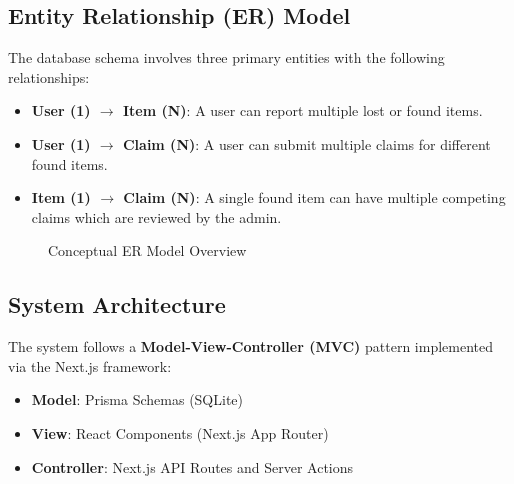 \documentclass[12pt, a4paper]{article}
\begin{document}
\subsection{Entity Relationship (ER) Model}
The database schema involves three primary entities with the following relationships:
\begin{itemize}
    \item \textbf{User (1) $\rightarrow$ Item (N)}: A user can report multiple lost or found items.
    \item \textbf{User (1) $\rightarrow$ Claim (N)}: A user can submit multiple claims for different found items.
    \item \textbf{Item (1) $\rightarrow$ Claim (N)}: A single found item can have multiple competing claims which are reviewed by the admin.
\end{itemize}
\begin{figure}[H]
    \centering
    \caption{Conceptual ER Model Overview}
\end{figure}

\subsection{System Architecture}
The system follows a \textbf{Model-View-Controller (MVC)} pattern implemented via the Next.js framework:
\begin{itemize}
    \item \textbf{Model}: Prisma Schemas (SQLite)
    \item \textbf{View}: React Components (Next.js App Router)
    \item \textbf{Controller}: Next.js API Routes and Server Actions
\end{itemize}
\end{document}
